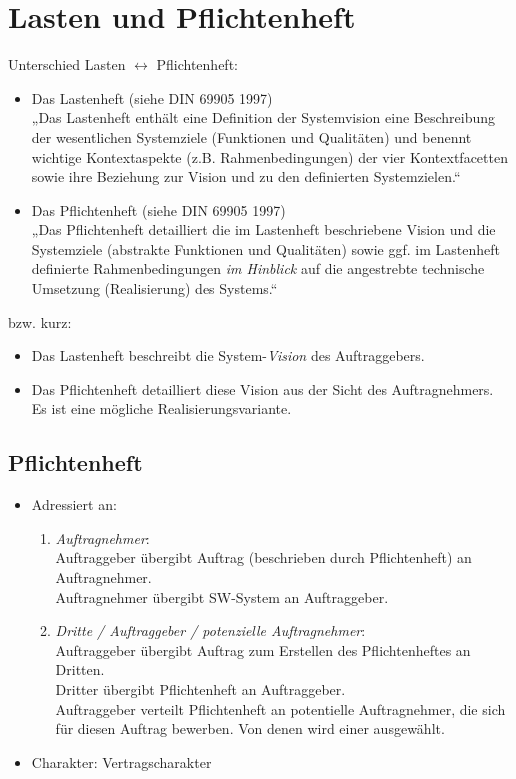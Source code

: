 \documentclass{scrreprt}
\begin{document}
\chapter{Lasten und Pflichtenheft}


Unterschied Lasten $\leftrightarrow$ Pflichtenheft:
\begin{itemize}
\item Das Lastenheft (siehe DIN 69905 1997)\\
„Das Lastenheft enthält eine Definition der Systemvision eine Beschreibung der wesentlichen Systemziele (Funktionen und Qualitäten) und benennt wichtige Kontextaspekte (z.B. Rahmenbedingungen) der vier Kontextfacetten sowie ihre Beziehung zur Vision und zu den definierten Systemzielen.“
\item Das Pflichtenheft (siehe DIN 69905 1997)\\
„Das Pflichtenheft detailliert die im Lastenheft beschriebene Vision und die Systemziele (abstrakte Funktionen und Qualitäten) sowie ggf. im Lastenheft definierte Rahmenbedingungen \emph{im Hinblick} auf die angestrebte technische Umsetzung (Realisierung) des Systems.“
\end{itemize}
bzw. kurz:
\begin{itemize}
\item Das Lastenheft beschreibt die System-\emph{Vision} des Auftraggebers.
\item Das Pflichtenheft detailliert diese Vision aus der Sicht des Auftragnehmers.\\
Es ist eine mögliche Realisierungsvariante.
\end{itemize}

\section{Pflichtenheft}

\begin{itemize}
\item Adressiert an:
\begin{enumerate}
\item \emph{Auftragnehmer}:\\
Auftraggeber übergibt Auftrag (beschrieben durch Pflichtenheft) an Auftragnehmer.\\
Auftragnehmer übergibt SW-System an Auftraggeber.
\item \emph{Dritte / Auftraggeber / potenzielle Auftragnehmer}:\\
Auftraggeber übergibt Auftrag zum Erstellen des Pflichtenheftes an Dritten.\\
Dritter übergibt Pflichtenheft an Auftraggeber.\\
Auftraggeber verteilt Pflichtenheft an potentielle Auftragnehmer, die sich für diesen Auftrag bewerben. Von denen wird einer ausgewählt.
\end{enumerate}
\item Charakter: 
Vertragscharakter
\end{itemize}
\end{document}
